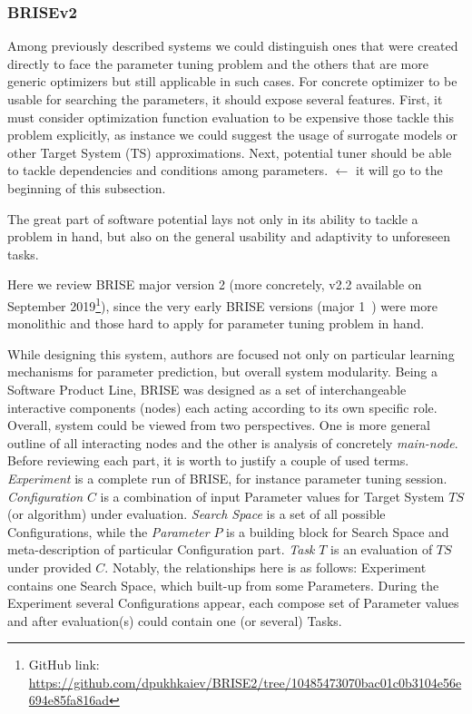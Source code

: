 \subsubsection{BRISEv2~\cite{brise2spl}}
Among previously described systems we could distinguish ones that were created directly to face the parameter tuning problem and the others that are more generic optimizers but still applicable in such cases.
For concrete optimizer to be usable for searching the parameters, it should expose several features. First, it must consider optimization function evaluation to be expensive those tackle this problem explicitly, as instance we could suggest the usage of surrogate models or other Target System (TS) approximations. Next, potential tuner should be able to tackle dependencies and conditions among parameters. $\leftarrow$ it will go to the beginning of this subsection.


The great part of software potential lays not only in its ability to tackle a problem in hand, but also on the general usability and adaptivity to unforeseen tasks. 

Here we review BRISE major version 2 (more concretely, v2.2 available on September 2019\footnote[1]{GitHub link: \url{https://github.com/dpukhkaiev/BRISE2/tree/10485473070bac01c0b3104e56e694e85fa816ad}}), since the very early BRISE versions (major 1~\cite{brise1monolite}) were more monolithic and those hard to apply for parameter tuning problem in hand.

While designing this system, authors are focused not only on particular learning mechanisms for parameter prediction, but overall system modularity.
Being a Software Product Line, BRISE was designed as a set of interchangeable interactive components (nodes) each acting according to its own specific role. 
Overall, system could be viewed from two perspectives. One is more general outline of all interacting nodes and the other is analysis of concretely \textit{main-node}.
Before reviewing each part, it is worth to justify a couple of used terms. \textit{Experiment} is a complete run of BRISE, for instance parameter tuning session. \textit{Configuration} $C$ is a combination of input Parameter values for Target System $TS$ (or algorithm) under evaluation. \textit{Search Space} is a set of all possible Configurations, while the \textit{Parameter} $P$ is a building block for Search Space and meta-description of particular Configuration part. \textit{Task} $T$ is an evaluation of $TS$ under provided $C$. Notably, the relationships here is as follows: Experiment contains one Search Space, which built-up from some Parameters. During the Experiment several Configurations appear, each compose set of Parameter values and after evaluation(s) could contain one (or several) Tasks.

